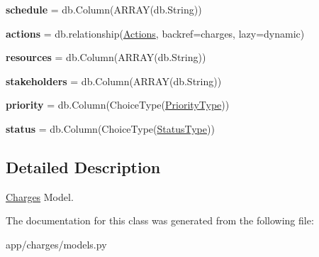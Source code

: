 \begin{DoxyCompactItemize}
{\bfseries schedule} = db.\+Column(A\+R\+R\+AY(db.\+String))
\item 
\mbox{\label{classapp_1_1charges_1_1models_1_1_charges_aa8690b0bc424efdd2c84baf90eace781}} 
{\bfseries actions} = db.\+relationship(\textquotesingle{}\mbox{\hyperlink{classapp_1_1actions_1_1models_1_1_actions}{Actions}}\textquotesingle{}, backref=\textquotesingle{}charges\textquotesingle{}, lazy=\textquotesingle{}dynamic\textquotesingle{})
\item 
\mbox{\label{classapp_1_1charges_1_1models_1_1_charges_a6ea2d6327d1d6cb5dc016ccede60a788}} 
{\bfseries resources} = db.\+Column(A\+R\+R\+AY(db.\+String))
\item 
\mbox{\label{classapp_1_1charges_1_1models_1_1_charges_ac530dc2cb9ecf1edd5cb12e7aa3eb06e}} 
{\bfseries stakeholders} = db.\+Column(A\+R\+R\+AY(db.\+String))
\item 
\mbox{\label{classapp_1_1charges_1_1models_1_1_charges_a8d32e2c6e5fb5995c2bce2e3ec9ceb69}} 
{\bfseries priority} = db.\+Column(Choice\+Type(\mbox{\hyperlink{classapp_1_1charges_1_1models_1_1_priority_type}{Priority\+Type}}))
\item 
\mbox{\label{classapp_1_1charges_1_1models_1_1_charges_aacd52559619e5d6a20706e2ac269e41b}} 
{\bfseries status} = db.\+Column(Choice\+Type(\mbox{\hyperlink{classapp_1_1charges_1_1models_1_1_status_type}{Status\+Type}}))
\end{DoxyCompactItemize}


\subsection{Detailed Description}
\mbox{\hyperlink{classapp_1_1charges_1_1models_1_1_charges}{Charges}} Model. 

The documentation for this class was generated from the following file\+:\begin{DoxyCompactItemize}
\item 
app/charges/models.\+py\end{DoxyCompactItemize}
